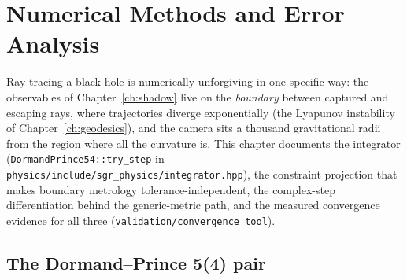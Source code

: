 \chapter{Numerical Methods and Error Analysis}
\label{ch:numerics}

Ray tracing a black hole is numerically unforgiving in one specific way:
the observables of Chapter~\ref{ch:shadow} live on the \emph{boundary}
between captured and escaping rays, where trajectories diverge
exponentially (the Lyapunov instability of Chapter~\ref{ch:geodesics}),
and the camera sits a thousand gravitational radii from the region where
all the curvature is. This chapter documents the integrator
(\texttt{DormandPrince54::try\_step} in
\texttt{physics/include/sgr\_physics/integrator.hpp}), the constraint
projection that makes boundary metrology tolerance-independent, the
complex-step differentiation behind the generic-metric path, and the
measured convergence evidence for all three
(\texttt{validation/convergence\_tool}).

\section{The Dormand--Prince 5(4) pair}
\label{sec:dp54}

